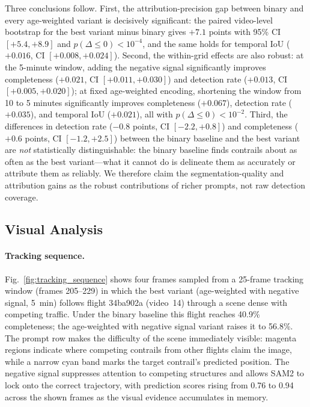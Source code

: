 \documentclass[review]{elsarticle}
\begin{document}
Three conclusions follow. First, the attribution-precision gap between binary and every age-weighted variant is decisively significant: the paired video-level bootstrap for the best variant minus binary gives $+7.1$ points with 95\% CI $[+5.4, +8.9]$ and $p(\Delta \le 0) < 10^{-4}$, and the same holds for temporal IoU ($+0.016$, CI $[+0.008, +0.024]$). Second, the within-grid effects are also robust: at the 5-minute window, adding the negative signal significantly improves completeness ($+0.021$, CI $[+0.011, +0.030]$) and detection rate ($+0.013$, CI $[+0.005, +0.020]$); at fixed age-weighted encoding, shortening the window from 10 to 5 minutes significantly improves completeness ($+0.067$), detection rate ($+0.035$), and temporal IoU ($+0.021$), all with $p(\Delta \le 0) < 10^{-2}$. Third, the differences in detection rate ($-0.8$ points, CI $[-2.2, +0.8]$) and completeness ($+0.6$ points, CI $[-1.2, +2.5]$) between the binary baseline and the best variant are \emph{not} statistically distinguishable: the binary baseline finds contrails about as often as the best variant---what it cannot do is delineate them as accurately or attribute them as reliably. We therefore claim the segmentation-quality and attribution gains as the robust contributions of richer prompts, not raw detection coverage.

\subsection{Visual Analysis}

\paragraph{Tracking sequence.} Fig.~\ref{fig:tracking_sequence} shows four frames sampled from a 25-frame tracking window (frames 205--229) in which the best variant (age-weighted with negative signal, 5~min) follows flight 34ba902a (video~14) through a scene dense with competing traffic. Under the binary baseline this flight reaches 40.9\% completeness; the age-weighted with negative signal variant raises it to 56.8\%. The prompt row makes the difficulty of the scene immediately visible: magenta regions indicate where competing contrails from other flights claim the image, while a narrow cyan band marks the target contrail's predicted position. The negative signal suppresses attention to competing structures and allows SAM2 to lock onto the correct trajectory, with prediction scores rising from 0.76 to 0.94 across the shown frames as the visual evidence accumulates in memory.
\end{document}
